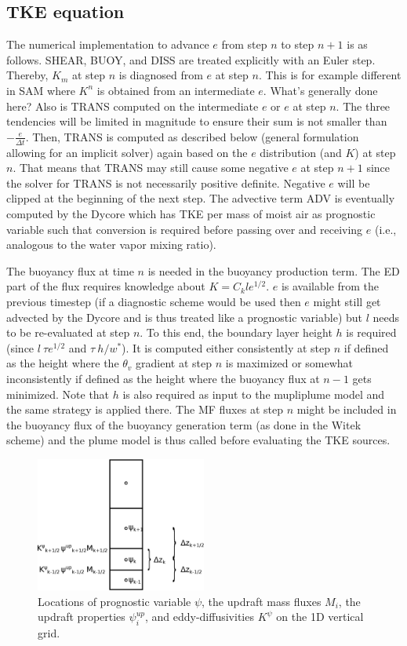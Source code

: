 \documentclass[dvipdfmx,a4paper,10pt]{article}
\begin{document}
\subsection{TKE equation}

The numerical implementation to advance $e$ from step $n$ to step $n+1$ is as follows. SHEAR, BUOY, and DISS are treated explicitly with an Euler step. Thereby, $K_m$ at step $n$ is diagnosed from $e$ at step $n$. {\color{blue} This is for example different in SAM where $K^n$ is obtained from an intermediate $e$. What's generally done here? Also is TRANS computed on the intermediate $e$ or $e$ at step $n$.} The three tendencies will be limited in magnitude to ensure their sum is not smaller than $-\frac{e}{\Delta t}$. Then, TRANS is computed as described below (general formulation allowing for an implicit solver) again based on the $e$ distribution (and $K$) at step $n$. That means that TRANS may still cause some negative $e$ at step $n+1$ since the solver for TRANS is not necessarily positive definite. Negative $e$ will be clipped at the beginning of the next step.  The advective term ADV is eventually computed by the Dycore which has TKE per mass of moist air as prognostic variable such that conversion is required before passing over and receiving $e$ (i.e., analogous to the water vapor mixing ratio). 

The buoyancy flux at time $n$ is needed in the buoyancy production term. The ED part of the flux requires knowledge about $K=C_k l e^{1/2}$. $e$ is available from the previous timestep (if a diagnostic scheme would be used then $e$ might still get advected by the Dycore and is thus treated like a prognostic variable) but $l$ needs to be re-evaluated at step $n$. To this end, the boundary layer height $h$ is required (since $l~ \tau e^{1/2}$ and $\tau ~ h/w^*$). It is computed either consistently at step $n$ if defined as the height where the $\theta_v$ gradient at step $n$ is maximized or somewhat inconsistently if defined as the height where the buoyancy flux at $n-1$ gets minimized.  Note that $h$ is also required as input to the mupliplume model and the same strategy is applied there. The MF fluxes at step $n$ might be included in the buoyancy flux of the buoyancy generation term (as done in the Witek scheme) and the plume model is thus called before evaluating the TKE sources.


\begin{figure}[bthp]
\centering
 \includegraphics[width=0.5\textwidth]{staggering.eps}
\caption{Locations of prognostic variable $\psi$, the updraft mass fluxes $M_i$, the updraft properties $\psi^{up}_i$, and eddy-diffusivities $K^{\psi}$ on the 1D vertical grid. } \label{fig:staggering}
\end{figure}
\end{document}
